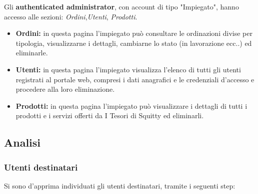 Gli \textbf{authenticated administrator}, con account di tipo "Impiegato", hanno accesso alle sezioni: \textit{Ordini},\textit{Utenti}, \textit{Prodotti}.

\begin{itemize}
	\item \textbf{Ordini:} in questa pagina l'impiegato può consultare le ordinazioni divise per tipologia, visualizzarne i dettagli, cambiarne lo stato (in lavorazione ecc..) ed eliminarle.

	\item \textbf{Utenti:} in questa pagina l'impiegato visualizza l'elenco di tutti gli utenti registrati al portale web, compresi i dati anagrafici e le credenziali d'accesso e procedere alla loro eliminazione.

	\item \textbf{Prodotti:} in questa pagina l'impiegato può visualizzare i dettagli di tutti i prodotti e i servizi offerti da I Tesori di Squitty ed eliminarli.
\end{itemize}

\subsection{Analisi}

\subsubsection{Utenti destinatari}

Si sono d'apprima individuati gli utenti destinatari, tramite i seguenti step:

